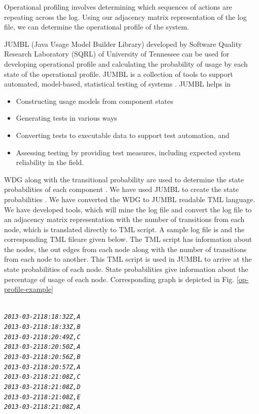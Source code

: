 \begin{enumerate}
Operational profiling involves determining which sequences of actions are repeating across the log. Using our adjacency matrix representation of the log file, we can determine the operational profile of the system. 

JUMBL (Java Usage Model Builder Library) developed by Software Quality Research Laboratory (SQRL) of University of Tennessee \cite{jumbl} can be used for developing operational profile and calculating the probability of usage by each state of the operational profile. JUMBL is a collection of tools to support automated, model-based, statistical testing of systems \cite{jug}. JUMBL helps in

\begin{itemize}
\item Constructing usage models from component states
\item Generating tests in various ways
\item Converting tests to executable data to support test automation, and
\item Assessing testing by providing test measures, including expected system reliability in the field.
\end{itemize}

WDG along with the transitional probability are used to determine the state probabilities of each component . We have used JUMBL to create the state probabilities \cite{anil}. We have converted the WDG to JUMBL readable TML \cite{tug} language. We have developed tools, which will mine the log file and convert the log file to an adjacency matrix representation with the number of transitions from each node, which is translated directly to TML script. A sample log file is and the corresponding TML fileare given below. The TML script has information about the nodes, the out edges from each node along with the number of transitions from each node to another. This TML script is used in JUMBL to arrive at the state probabilities of each node. State probabilities give information about the percentage of usage of each node. Corresponding graph is depicted in Fig. \ref{op-profile-example}



\begin{alltt}
\small{ \emph{
2013-03-21 18:18:32Z,A
2013-03-21 18:18:33Z,B
2013-03-21 18:20:49Z,C
2013-03-21 18:20:50Z,A
2013-03-21 18:20:56Z,B
2013-03-21 18:20:57Z,A
2013-03-21 18:21:08Z,C
2013-03-21 18:21:08Z,D
2013-03-21 18:21:08Z,E
2013-03-21 18:21:08Z,A
}}
\end{alltt}


\end{enumerate}
